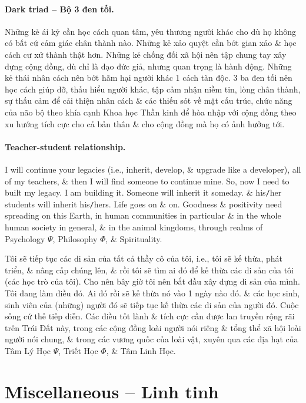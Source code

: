 \documentclass[12pt]{article}
\begin{document}
\paragraph*{Dark triad -- Bộ 3 đen tối.} Những kẻ ái kỷ cần học cách quan tâm, yêu thương người khác cho dù họ không có bất cứ cảm giác chân thành nào. Những kẻ xảo quyệt cần bớt gian xảo \& học cách cư xử thành thật hơn. Những kẻ chống đối xã hội nên tập chung tay xây dựng cộng đồng, dù chỉ là đạo đức giả, nhưng quan trọng là hành động. Những kẻ thái nhân cách nên bớt hãm hại người khác 1 cách tàn độc. 3 ba đen tối nên học cách giúp đỡ, thấu hiểu người khác, tập cảm nhận niềm tin, lòng chân thành, sự thấu cảm để cải thiện nhân cách \& các thiếu sót về mặt cấu trúc, chức năng của não bộ theo khía cạnh Khoa học Thần kinh để hòa nhập với cộng đồng theo xu hướng tích cực cho cả bản thân \& cho cộng đồng mà họ có ảnh hưởng tới.

\paragraph*{Teacher-student relationship.} I will continue your legacies (i.e., inherit, develop, \& upgrade like a developer), all of my teachers, \& then I will find someone to continue mine. So, now I need to built my legacy. I am building it. Someone will inherit it someday. \& his{\tt/}her students will inherit his{\tt/}hers. Life goes on \& on. Goodness \& positivity need spreading on this Earth, in human communities in particular \& in the whole human society in general, \& in the animal kingdoms, through realms of Psychology $\Psi$, Philosophy $\Phi$, \& Spirituality.

Tôi sẽ tiếp tục các di sản của tất cả thầy cô của tôi, i.e., tôi sẽ kế thừa, phát triển, \& nâng cấp chúng lên, \& rồi tôi sẽ tìm ai đó để kế thừa các di sản của tôi (các học trò của tôi). Cho nên bây giờ tôi nên bắt đầu xây dựng di sản của mình. Tôi đang làm điều đó. Ai đó rồi sẽ kế thừa nó vào 1 ngày nào đó. \& các học sinh, sinh viên của (những) người đó sẽ tiếp tục kế thừa các di sản của người đó. Cuộc sống cứ thế tiếp diễn. Các điều tốt lành \& tích cực cần được lan truyền rộng rãi trên Trái Đất này, trong các cộng đồng loài người nói riêng \& tổng thể xã hội loài người nói chung, \& trong các vương quốc của loài vật, xuyên qua các địa hạt của Tâm Lý Học $\Psi$, Triết Học $\Phi$, \& Tâm Linh Học.


\section{Miscellaneous -- Linh tinh}
\end{document}
